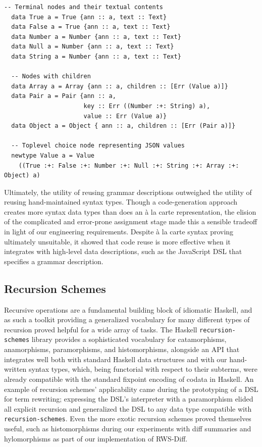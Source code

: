 \documentclass[acmsmall,fleqn]{acmart}
\begin{document}
\begin{lstlisting}[label={code:codegen}, keywords={type,data,newtype},
  title={
    A simplified representation of the syntax types generated
    from the Tree-sitter grammar for JSON.
  }
  ]
  -- Terminal nodes and their textual contents
  data True a = True {ann :: a, text :: Text}
  data False a = True {ann :: a, text :: Text}
  data Number a = Number {ann :: a, text :: Text}
  data Null a = Number {ann :: a, text :: Text}
  data String a = Number {ann :: a, text :: Text}

  -- Nodes with children
  data Array a = Array {ann :: a, children :: [Err (Value a)]}
  data Pair a = Pair {ann :: a,
                      key :: Err ((Number :+: String) a),
                      value :: Err (Value a)}
  data Object a = Object { ann :: a, children :: [Err (Pair a)]}

  -- Toplevel choice node representing JSON values
  newtype Value a = Value
    ((True :+: False :+: Number :+: Null :+: String :+: Array :+: Object) a)
\end{lstlisting}

Ultimately, the utility of reusing grammar descriptions outweighed the utility
of reusing hand-maintained syntax types. Though a code-generation approach
creates more syntax data types than does an à la carte representation, the
elision of the complicated and error-prone assignment stage made this a sensible
tradeoff in light of our engineering requirements. Despite à la carte syntax
proving ultimately unsuitable, it showed that code reuse is more effective when
it integrates with high-level data descriptions, such as the JavaScript DSL
that specifies a grammar description.



\subsection{Recursion Schemes} \label{sec:recschemes}

Recursive operations are a fundamental building block of idiomatic Haskell, and
as such a toolkit providing a generalized vocabulary for many different types of
recursion proved helpful for a wide array of tasks. The Haskell \texttt{recursion-schemes}
library provides a sophisticated vocabulary for catamorphisms, anamorphisms,
paramorphisms, and histomorphisms, alongside an API that integrates well
both with standard Haskell data structures and with our hand-written syntax
types, which, being functorial with respect to their subterms, were already
compatible with the standard fixpoint encoding of codata in Haskell. An example
of recursion schemes' applicability came during the prototyping of a DSL for
term rewriting; expressing the DSL's interpreter with a paramorphism elided all
explicit recursion and generalized the DSL to any data type compatible with
\texttt{recursion-schemes}. Even the more exotic recursion schemes proved
themselves useful, such as histomorphisms during our experiments with diff
summaries and hylomorphisms as part of our implementation of RWS-Diff.
\end{document}
